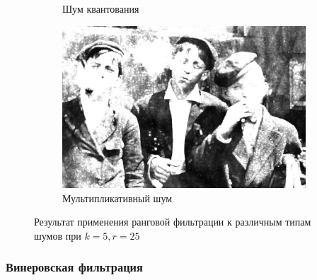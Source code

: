 \begin{figure}[ht!]
\begin{subfigure}[b]{0.5\linewidth}
      \caption{Шум квантования} 
      \label{rang_5_25:e}
    \end{subfigure}%
    \begin{subfigure}[b]{0.5\linewidth}
        \centering
        \includegraphics[width=0.95\linewidth]{../Rang_Filter/Rang_Speckle_noise_(k=5,r=25).jpg} 
        \caption{Мультипликативный шум} 
        \label{rang_5_25:f} 
    \end{subfigure} 
    \caption{Результат применения ранговой фильтрации к различным типам шумов при $k = 5, r = 25$}
    \label{img:rang_5_25} 
\end{figure}
\FloatBarrier

\subsubsection{Винеровская фильтрация}


